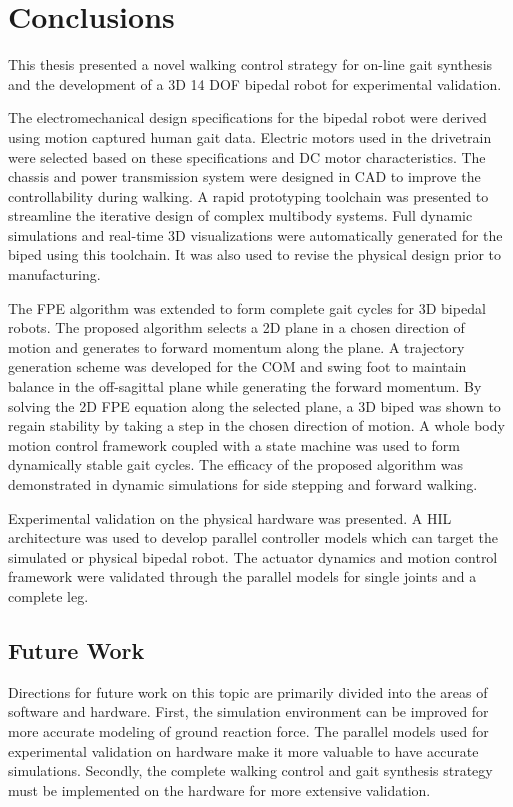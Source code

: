 \chapter{Conclusions} %
\label{cha:conclusion}

This thesis presented a novel walking control strategy for on-line gait synthesis and the development of a 3D 14 DOF bipedal robot for experimental validation. 

The electromechanical design specifications for the bipedal robot were  derived using motion captured human gait data. Electric motors used in the drivetrain were selected based on these specifications and DC motor characteristics. The chassis and power transmission system were designed in CAD to improve the controllability during walking. A rapid prototyping toolchain was presented to streamline the iterative design of complex multibody systems. Full dynamic simulations and real-time 3D visualizations were automatically generated for the biped using this toolchain. It was also used to revise the physical design prior to manufacturing. 

The FPE algorithm was extended to form complete gait cycles for 3D bipedal robots. The proposed algorithm selects a 2D plane in a chosen direction of motion and generates to forward momentum along the plane. A trajectory generation scheme was developed for the COM and swing foot to maintain balance in the off-sagittal plane while generating the forward momentum. By solving the 2D FPE equation along the selected plane, a 3D biped was shown to regain stability by taking a step in the chosen direction of motion. A whole body motion control framework coupled with a state machine was used to form dynamically stable gait cycles. The efficacy of the proposed algorithm was demonstrated in dynamic simulations for side stepping and forward walking. 

Experimental validation on the physical hardware was presented. A HIL architecture was used to develop parallel controller models which can target the simulated or physical bipedal robot. The actuator dynamics and motion control framework were validated through the parallel models for single joints and a complete leg.  

\section{Future Work} %
\label{sec:future_work}
Directions for future work on this topic are primarily divided into the areas of software and hardware. First, the simulation environment can be improved for more accurate modeling of ground reaction force. The parallel models used for experimental validation on hardware make it more valuable to have accurate simulations. Secondly, the complete walking control and gait synthesis strategy must be implemented on the hardware for more extensive validation. 

